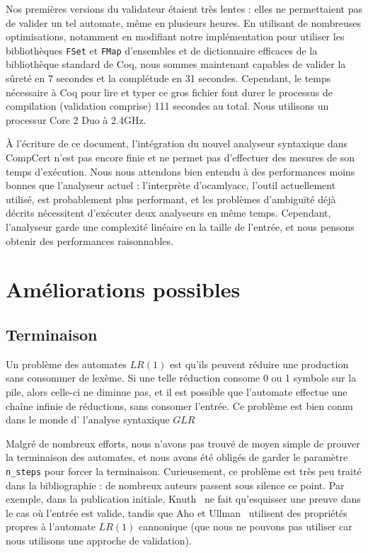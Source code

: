 \documentclass[a4paper,11pt]{article}
\begin{document}
Nos premières versions du validateur étaient très lentes : elles ne
permettaient pas de valider un tel automate, même en plusieurs
heures. En utilisant de nombreuses optimisations, notamment en
modifiant notre implémentation pour utiliser les bibliothèques
\verb+FSet+ et \verb+FMap+ d'ensembles et de dictionnaire efficaces de
la bibliothèque standard de Coq, nous sommes maintenant capables de
valider la sûreté en 7 secondes et la complétude en 31
secondes. Cependant, le temps nécessaire à Coq pour lire et typer ce
gros fichier font durer le processus de compilation (validation
comprise) 111 secondes au total. Nous utilisons un processur Core 2 Duo
à 2.4GHz.

\`A l'écriture de ce document, l'intégration du nouvel analyseur
syntaxique dans CompCert n'est pas encore finie et ne permet pas
d'effectuer des mesures de son temps d'exécution. Nous nous attendons
bien entendu à des performances moins bonnes que l'analyseur actuel :
l'interprète d'ocamlyacc, l'outil actuellement utilisé, est
probablement plus performant, et les problèmes d'ambiguïté déjà
décrits nécessitent d'exécuter deux analyseurs en même
temps. Cependant, l'analyseur garde une complexité linéaire en la
taille de l'entrée, et nous pensons obtenir des performances
raisonnables.

\section{Améliorations possibles}

\subsection{Terminaison}

Un problème des automates $LR(1)$ est qu'ils peuvent réduire une
production sans consommer de lexème. Si une telle réduction consome 0
ou 1 symbole sur la pile, alors celle-ci ne diminue pas, et il est
possible que l'automate effectue une chaîne infinie de réductions,
sans consomer l'entrée. Ce problème est bien connu dans le monde d'
l'analyse syntaxique $GLR$

Malgré de nombreux efforts, nous n'avons pas trouvé de moyen simple de
prouver la terminaison des automates, et nous avons été obligés de
garder le paramètre \verb+n_steps+ pour forcer la
terminaison. Curieusement, ce problème est très peu traité dans la
bibliographie : de nombreux auteurs passent sous silence ce
point. Par exemple, dans la publication initiale, Knuth~\cite{lr} ne
fait qu'esquisser une preuve dans le cas où l'entrée est valide,
tandis que Aho et Ullman~\cite{ahoulman} utilisent des propriétés
propres à l'automate $LR(1)$ cannonique (que nous ne pouvons pas
utiliser car nous utilisons une approche de validation).
\end{document}
